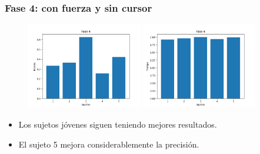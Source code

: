 \documentclass[pdf]{beamer}
\begin{document}
\begin{frame}
	\frametitle{Fase 4: con fuerza y sin cursor}
	\begin{figure}
		\centering
		
		\includegraphics[width=0.45\textwidth]{fase4-errores}
		\includegraphics[width=0.45\textwidth]{fase4-time}
	\end{figure}
\begin{itemize}
	\item Los sujetos jóvenes siguen teniendo mejores resultados.
	\item El sujeto 5 mejora considerablemente la precisión.
\end{itemize}
\end{frame}
\end{document}
